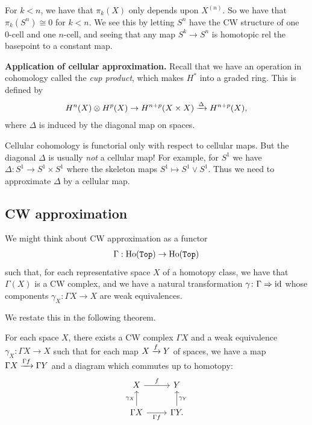 \documentclass{article}[11pt]
\begin{document}
\begin{note} For $k<n$, we have that $\pi_k(X)$ only depends upon $X^{(n)}$. So we have that $\pi_k(S^n) \cong 0$ for $k<n$. We see this by letting $S^n$ have the CW structure of one 0-cell and one $n$-cell, and seeing that any map $S^k \to S^n$ is homotopic rel the basepoint to a constant map.
\end{note}

\textbf{Application of cellular approximation.} Recall that we have an operation in cohomology called the \textit{cup product}, which makes $H^\ast$ into a graded ring. This is defined by
\begin{align*}
	H^n(X) \otimes H^p(X) \to H^{n+p}(X\times X) \xrightarrow{\Delta} H^{n+p}(X),
\end{align*}
where $\Delta$ is induced by the diagonal map on spaces.

\begin{note} Cellular cohomology is functorial only with respect to cellular maps. But the diagonal $\Delta$ is usually \textit{not} a cellular map! For example, for $S^1$ we have $\Delta: S^1 \to S^1\times S^1$ where the skeleton maps $S^1\mapsto S^1 \vee S^1$. Thus we need to approximate $\Delta$ by a cellular map.
\end{note}



\subsection{CW approximation} We might think about CW approximation as a functor
\begin{align*}
	\Gamma: \text{Ho}(\texttt{Top}) \to \text{Ho}(\texttt{Top})
\end{align*}
such that, for each representative space $X$ of a homotopy class, we have that $\Gamma(X)$ is a CW complex, and we have a natural transformation $\gamma\colon  \Gamma \Rightarrow \text{id}$ whose components $\gamma_X \colon \Gamma X \to X$ are weak equivalences.


We restate this in the following theorem.


\begin{theorem} For each space $X$, there exists a CW complex $\Gamma X$ and a weak equivalence $\gamma_X \colon \Gamma X \to X$ such that for each map $X\xrightarrow{f} Y$ of spaces, we have a map $\Gamma X \xrightarrow{\Gamma f} \Gamma Y$ and a diagram which commutes up to homotopy:
\[
	\begin{tikzcd}
	X\rar["f" above] & Y \\
	\Gamma X\uar["\gamma_X" left]\rar["\Gamma f" below] & \Gamma Y.\uar["\gamma_Y" right]
	\end{tikzcd}
\]
\end{theorem}
\end{document}
